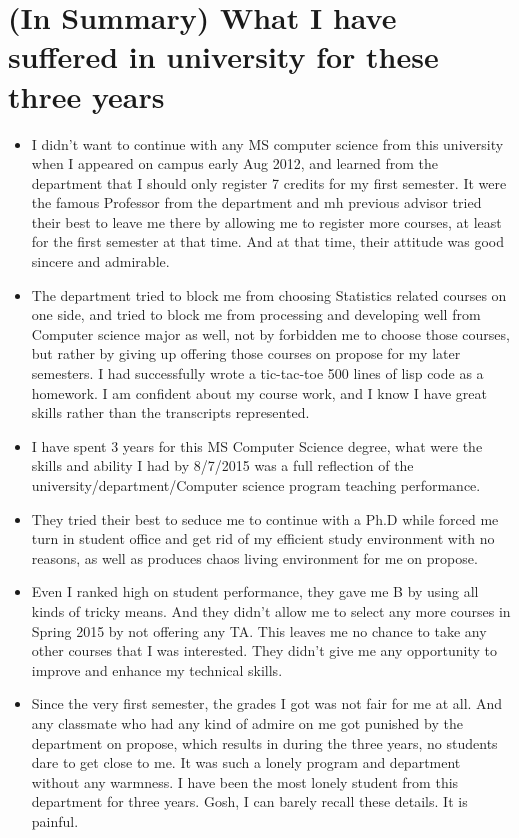 \documentclass[9pt,b5paper]{article}
\begin{document}
\section{(In Summary) What I have suffered in university for these three years}
\label{sec-7}
\begin{itemize}
\item I didn't want to continue with any MS computer science from this university when I appeared on campus early Aug 2012, and learned from the department that I should only register 7 credits for my first semester. It were the famous Professor from the department and mh previous advisor tried their best to leave me there by allowing me to register more courses, at least for the first semester at that time. And at that time, their attitude was good sincere and admirable.
\item The department tried to block me from choosing Statistics related courses on one side, and tried to block me from processing and developing well from Computer science major as well, not by forbidden me to choose those courses, but rather by giving up offering those courses on propose for my later semesters. I had successfully wrote a tic-tac-toe 500 lines of lisp code as a homework. I am confident about my course work, and I know I have great skills rather than the transcripts represented.
\item I have spent 3 years for this MS Computer Science degree, what were the skills and ability I had by 8/7/2015 was a full reflection of the university/department/Computer science program teaching performance.
\item They tried their best to seduce me to continue with a Ph.D while forced me turn in student office and get rid of my efficient study environment with no reasons, as well as produces chaos living environment for me on propose.
\item Even I ranked high on student performance, they gave me B by using all kinds of tricky means. And they didn't allow me to select any more courses in Spring 2015 by not offering any TA. This leaves me no chance to take any other courses that I was interested. They didn't give me any opportunity to improve and enhance my technical skills.
\item Since the very first semester, the grades I got was not fair for me at all. And any classmate who had any kind of admire on me got punished by the department on propose, which results in during the three years, no students dare to get close to me. It was such a lonely program and department without any warmness. I have been the most lonely student from this department for three years. Gosh, I can barely recall these details. It is painful.

\end{itemize}
\end{document}
